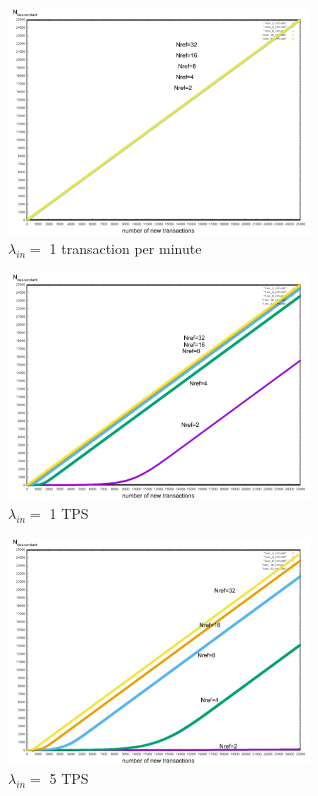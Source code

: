 \documentclass[a4paper,10pt,twocolumn]{article}
\begin{document}
	 \begin{appendices}
	\label{Appendix B}
	
	 \begin{figure}[H]
		\begin{center}
			\includegraphics[width=80mm]{1min_ref.png}
			\caption{\( \lambda_{in}=\) 1 transaction per minute}
		  \label{fig:min1_ref}
		\end{center}
	 \end{figure}
	
	 \begin{figure}[H]
		\begin{center}
			\includegraphics[width=80mm]{1sec_ref.png}
			\caption{\( \lambda_{in}=\) 1 TPS}
		  \label{fig:sec1_ref}
		\end{center}
	 \end{figure}
	
	
	 \begin{figure}[H]
		\begin{center}
			\includegraphics[width=80mm]{5sec_ref.png}
			\caption{ \( \lambda_{in}=\) 5  TPS}
		  \label{fig:sec5_ref}
		\end{center}
	 \end{figure}
	

\end{appendices}
\end{document}
